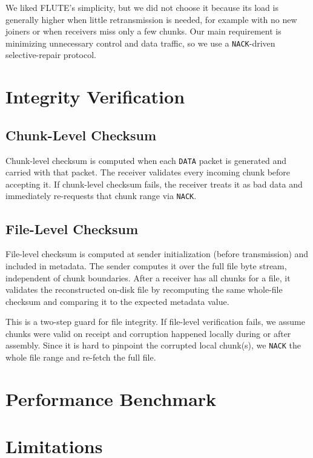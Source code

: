 \documentclass{article}
\begin{document}
We liked FLUTE's simplicity, but we did not choose it because its load is generally higher when little retransmission is needed, for example with no new joiners or when receivers miss only a few chunks. Our main requirement is minimizing unnecessary control and data traffic, so we use a \texttt{NACK}-driven selective-repair protocol.

\section*{Integrity Verification}

\subsection*{Chunk-Level Checksum}

Chunk-level checksum is computed when each \texttt{DATA} packet is generated and carried with that packet. The receiver validates every incoming chunk before accepting it. If chunk-level checksum fails, the receiver treats it as bad data and immediately re-requests that chunk range via \texttt{NACK}.

\subsection*{File-Level Checksum}

File-level checksum is computed at sender initialization (before transmission) and included in metadata. The sender computes it over the full file byte stream, independent of chunk boundaries.
After a receiver has all chunks for a file, it validates the reconstructed on-disk file by recomputing the same whole-file checksum and comparing it to the expected metadata value.

This is a two-step guard for file integrity. If file-level verification fails, we assume chunks were valid on receipt and corruption happened locally during or after assembly. Since it is hard to pinpoint the corrupted local chunk(s), we \texttt{NACK} the whole file range and re-fetch the full file.

\section*{Performance Benchmark}

\section*{Limitations}
\end{document}
